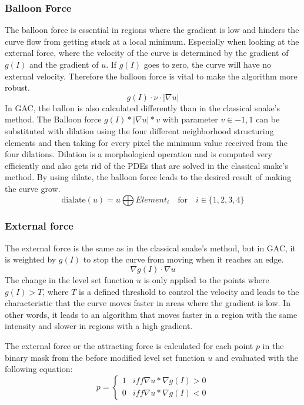 \subsubsection{Balloon Force}
The balloon force is essential in regions where the gradient is low and hinders the curve flow from getting stuck at a local minimum. Especially when looking at the external force, where the velocity of the curve is determined by the gradient of $g(I)$ and the gradient of $u$. If $g(I)$ goes to zero, the curve will have no external velocity. Therefore the balloon force is vital to make the algorithm more robust.
\begin{equation}
    g(I) \cdot \nu \cdot |\nabla u|
\end{equation}
In GAC, the ballon is also calculated differently than in the classical snake's method. 
The Balloon force $g(I)*|\nabla u| *v$ with parameter $v \in  {-1,1}$ can be substituted with dilation using the four different neighborhood structuring elements and then taking for every pixel the minimum value received from the four dilations. Dilation is a morphological operation and is computed very efficiently and also gets rid of the PDEs that are solved in the classical snake's method. By using dilate, the balloon force leads to the desired result of making the curve grow. 
\begin{equation}
    \text{dialate}(u)  =  u \bigoplus Element_i \quad \text{for} \quad i \in \{1,2,3,4\}
    \label{dialate}
\end{equation}

\subsubsection{External force}
The external force is the same as in the classical snake's method, but in GAC, it is weighted by $g(I)$ to stop the curve from moving when it reaches an edge.
\begin{equation}
    \nabla g(I) \cdot \nabla u
\end{equation}
The change in the level set function $u$ is only applied to the points where $g(I) > T$, where $T$ is a defined threshold to control the velocity and leads to the characteristic that the curve moves faster in areas where the gradient is low. In other words, it leads to an algorithm that moves faster in a region with the same intensity and slower in regions with a high gradient. 

The external force or the attracting force is calculated for each point $p$ in the binary mask from the before modified level set function $u$ and evaluated with the following equation:
\begin{equation}
    p = \begin{cases}
        1 &iff  \nabla u * \nabla g(I) > 0 \\
        0 &iff \nabla u * \nabla g(I) < 0
    \end{cases}
    \label{eq:externalforce}
\end{equation}
